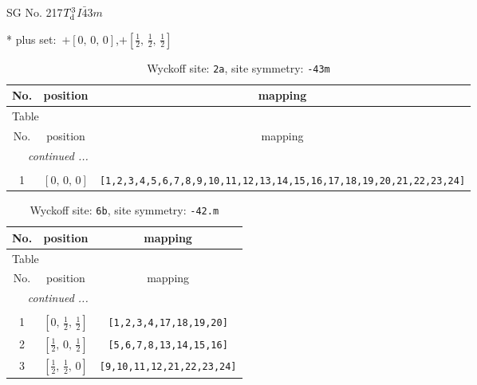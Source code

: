 \documentclass[fleqn,8pt]{jsarticle}
\begin{document}
\setcounter{MaxMatrixCols}{32}

\renewcommand{\tablename}{Table~}
\renewcommand{\figurename}{Figure~}
\begin{center}
\LARGE
SG No. 217\quad$T_{\rm d}^{3}$\quad$I\bar{4}3m$\quad[ cubic ]
\end{center}
* plus set:\,\,\,$+\left[ 0,\, 0,\, 0 \right]$,\quad $+\left[ \frac{1}{2},\, \frac{1}{2},\, \frac{1}{2} \right]$
\renewcommand{\arraystretch}{1.2}
\begin{longtable}{ccc}
\caption{Wyckoff site: {\tt 2a}, site symmetry: {\tt -43m}}
 \\
 \hline \hline
No. & position & mapping \\ \hline \endfirsthead

\multicolumn{2}{l}{\tablename\ \thetable{}} \\
 \hline \hline
No. & position & mapping \\ \hline \endhead

 \hline \hline
\multicolumn{2}{r}{\footnotesize\it continued ...} \\ \endfoot

 \hline \hline
\multicolumn{2}{r}{} \\ \endlastfoot

1 & $\left[ 0,\, 0,\, 0 \right]$ & {\tt [1,2,3,4,5,6,7,8,9,10,11,12,13,14,15,16,17,18,19,20,21,22,23,24]} \\
\end{longtable}
\renewcommand{\arraystretch}{1.2}
\begin{longtable}{ccc}
\caption{Wyckoff site: {\tt 6b}, site symmetry: {\tt -42.m}}
 \\
 \hline \hline
No. & position & mapping \\ \hline \endfirsthead

\multicolumn{2}{l}{\tablename\ \thetable{}} \\
 \hline \hline
No. & position & mapping \\ \hline \endhead

 \hline \hline
\multicolumn{2}{r}{\footnotesize\it continued ...} \\ \endfoot

 \hline \hline
\multicolumn{2}{r}{} \\ \endlastfoot

1 & $\left[ 0,\, \frac{1}{2},\, \frac{1}{2} \right]$ & {\tt [1,2,3,4,17,18,19,20]} \\ \hline
2 & $\left[ \frac{1}{2},\, 0,\, \frac{1}{2} \right]$ & {\tt [5,6,7,8,13,14,15,16]} \\ \hline
3 & $\left[ \frac{1}{2},\, \frac{1}{2},\, 0 \right]$ & {\tt [9,10,11,12,21,22,23,24]} \\
\end{longtable}
\end{document}
